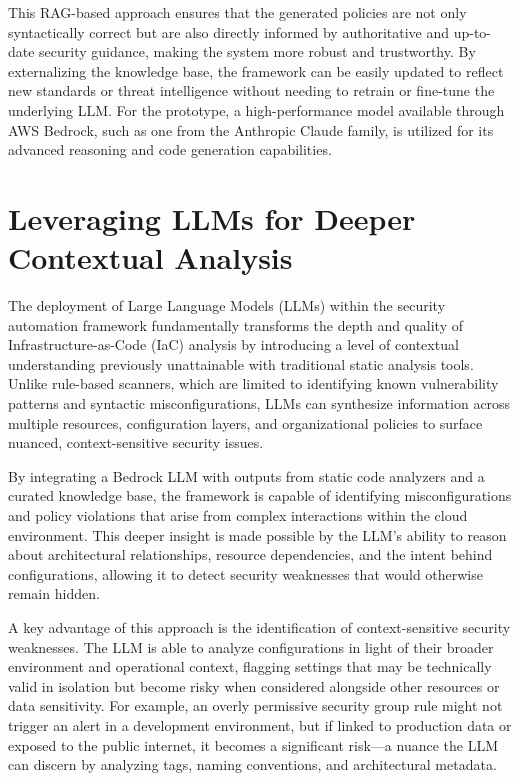 This RAG-based approach ensures that the generated policies are not only syntactically correct but are also directly informed by authoritative and up-to-date security guidance, making the system more robust and trustworthy. By externalizing the knowledge base, the framework can be easily updated to reflect new standards or threat intelligence without needing to retrain or fine-tune the underlying LLM. For the prototype, a high-performance model available through AWS Bedrock, such as one from the Anthropic Claude family, is utilized for its advanced reasoning and code generation capabilities.


\section{Leveraging LLMs for Deeper Contextual Analysis} %
\label{sec:Leveraging LLMs for Deeper Contextual Analysis}

The deployment of Large Language Models (LLMs) within the security automation framework fundamentally transforms the depth and quality of Infrastructure-as-Code (IaC) analysis by introducing a level of contextual understanding previously unattainable with traditional static analysis tools\cite{li_iris_2025, andrade_enhancing_2025-1}. Unlike rule-based scanners, which are limited to identifying known vulnerability patterns and syntactic misconfigurations, LLMs can synthesize information across multiple resources, configuration layers, and organizational policies to surface nuanced, context-sensitive security issues\cite{li_iris_2025}.

By integrating a Bedrock LLM with outputs from static code analyzers and a curated knowledge base, the framework is capable of identifying misconfigurations and policy violations that arise from complex interactions within the cloud environment\cite{andrade_enhancing_2025-1}. This deeper insight is made possible by the LLM’s ability to reason about architectural relationships, resource dependencies, and the intent behind configurations, allowing it to detect security weaknesses that would otherwise remain hidden\cite{li_iris_2025, andrade_enhancing_2025-1}.

A key advantage of this approach is the identification of context-sensitive security weaknesses. The LLM is able to analyze configurations in light of their broader environment and operational context, flagging settings that may be technically valid in isolation but become risky when considered alongside other resources or data sensitivity. For example, an overly permissive security group rule might not trigger an alert in a development environment, but if linked to production data or exposed to the public internet, it becomes a significant risk—a nuance the LLM can discern by analyzing tags, naming conventions, and architectural metadata\cite{andrade_enhancing_2025-1}.

